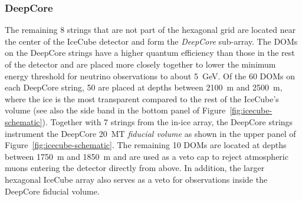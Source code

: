 \subsubsection{DeepCore}
The remaining 8 strings that are not part of the hexagonal grid are located near the center of the IceCube detector and form the \emph{DeepCore} sub-array.
The DOMs on the DeepCore strings have a higher quantum efficiency than those in the rest of the detector and are placed more closely together to lower the minimum energy threshold for neutrino observations to about 5~GeV.
Of the 60 DOMs on each DeepCore string, 50 are placed at depths between 2100~m and 2500~m, where the ice is the most transparent compared to the rest of the IceCube's volume (see also the side band in the bottom panel of Figure~\ref{fig:icecube-schematic}).
Together with 7 strings from the in-ice array, the DeepCore strings instrument the DeepCore 20~MT \emph{fiducial volume} as shown in the upper panel of Figure~\ref{fig:icecube-schematic}.
The remaining 10 DOMs are located at depths between 1750~m and 1850~m and are used as a veto cap to reject atmospheric muons entering the detector directly from above.
In addition, the larger hexagonal IceCube array also serves as a veto for observations inside the DeepCore fiducial volume.
